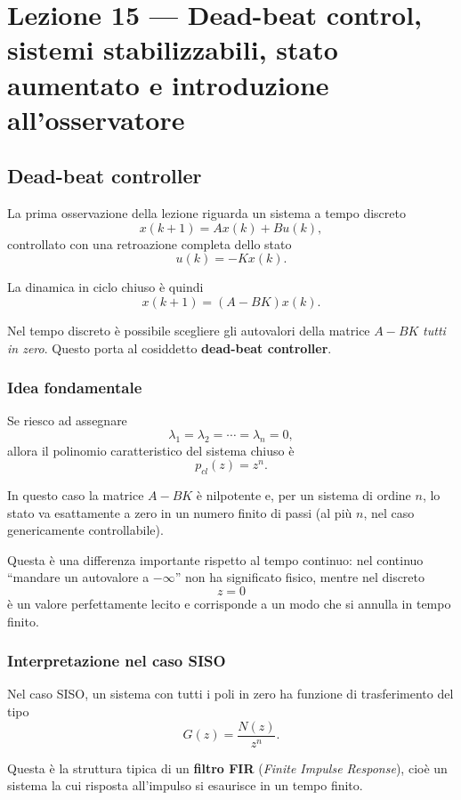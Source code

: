 \chapter{Lezione 15 --- Dead-beat control, sistemi stabilizzabili, stato aumentato e introduzione all'osservatore}

\section{Dead-beat controller}

La prima osservazione della lezione riguarda un sistema a tempo discreto
\[
x(k+1)=Ax(k)+Bu(k),
\]
controllato con una retroazione completa dello stato
\[
u(k)=-Kx(k).
\]

La dinamica in ciclo chiuso è quindi
\[
x(k+1)=(A-BK)x(k).
\]

Nel tempo discreto è possibile scegliere gli autovalori della matrice \(A-BK\) \emph{tutti in zero}.
Questo porta al cosiddetto \textbf{dead-beat controller}.

\subsection{Idea fondamentale}

Se riesco ad assegnare
\[
\lambda_1=\lambda_2=\cdots=\lambda_n=0,
\]
allora il polinomio caratteristico del sistema chiuso è
\[
p_{cl}(z)=z^n.
\]

In questo caso la matrice \(A-BK\) è nilpotente e, per un sistema di ordine \(n\),
lo stato va esattamente a zero in un numero finito di passi (al più \(n\), nel caso genericamente controllabile).

Questa è una differenza importante rispetto al tempo continuo:
nel continuo ``mandare un autovalore a \(-\infty\)'' non ha significato fisico,
mentre nel discreto
\[
z=0
\]
è un valore perfettamente lecito e corrisponde a un modo che si annulla in tempo finito.

\subsection{Interpretazione nel caso SISO}

Nel caso SISO, un sistema con tutti i poli in zero ha funzione di trasferimento del tipo
\[
G(z)=\frac{N(z)}{z^n}.
\]

Questa è la struttura tipica di un \textbf{filtro FIR} (\emph{Finite Impulse Response}),
cioè un sistema la cui risposta all'impulso si esaurisce in un tempo finito.

